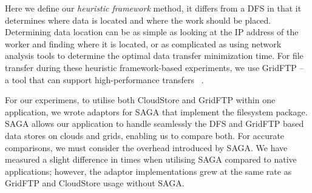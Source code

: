 \documentclass{rspublic}
\begin{document}
Here we define our \textit{heuristic framework} method, it differs from
a DFS in that it determines where data is located and where the work
should be placed. Determining data location can be as simple as looking
at the IP address of the worker and finding where it is located, or as
complicated as using network analysis tools to determine the optimal
data transfer minimization time. For file transfer during these
heuristic framework-based experiments, we use GridFTP -- a tool that can
support high-performance transfers ~\citep{gridftp_web}.

For our experimens, to utilise both CloudStore and GridFTP within one
application, we wrote adaptors for SAGA that implement the filesystem
package. SAGA allows our application to handle seamlessly the DFS and
GridFTP based data stores on clouds and grids, enabling us to compare
both. For accurate comparisons, we must consider the overhead
introduced by SAGA. We have measured a slight difference in times when
utilising SAGA compared to native applications; however, the adaptor
implementations grew at the same rate as GridFTP and CloudStore usage
without SAGA. 


\vspace{-0.3cm}
\end{document}
